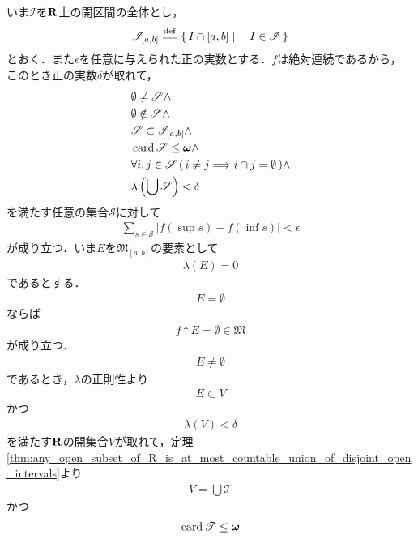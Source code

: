 	\begin{sketch}
		いま$\mathscr{I}$を$\mathbf{R}$上の開区間の全体とし，
		\begin{align}
			\mathscr{I}_{[a,b]} \defeq \Set{I \cap [a,b]}{I \in \mathscr{I}}
		\end{align}
		とおく．また$\epsilon$を任意に与えられた正の実数とする．$f$は絶対連続であるから，
		このとき正の実数$\delta$が取れて，
		\begin{align}
			&\emptyset \neq \mathscr{S} \wedge \\
			&\emptyset \notin \mathscr{S} \wedge \\
			&\mathscr{S} \subset \mathscr{I}_{[a,b]} \wedge \\
			&\operatorname{card} \mathscr{S} \leq {\boldsymbol \omega} \wedge \\
			&\forall i,j \in \mathscr{S}\, (\, i \neq j \Longrightarrow i \cap j = \emptyset\, ) \wedge \\
			&\lambda\left(\bigcup \mathscr{S}\right) < \delta
		\end{align}
		を満たす任意の集合$\mathscr{S}$に対して
		\begin{align}
			\sum_{s \in \mathscr{S}} |f(\sup{}{s}) - f(\inf{}{s})| < \epsilon
		\end{align}
		が成り立つ．いま$E$を$\mathfrak{M}_{[a,b]}$の要素として
		\begin{align}
			\lambda(E) = 0
		\end{align}
		であるとする．
		\begin{align}
			E = \emptyset
		\end{align}
		ならば
		\begin{align}
			f \ast E = \emptyset \in \mathfrak{M}
		\end{align}
		が成り立つ．
		\begin{align}
			E \neq \emptyset
		\end{align}
		であるとき，$\lambda$の正則性より
		\begin{align}
			E \subset V
		\end{align}
		かつ
		\begin{align}
			\lambda(V) < \delta
		\end{align}
		を満たす$\mathbf{R}$の開集合$V$が取れて，定理\ref{thm:any_open_subset_of_R_is_at_most_countable_union_of_disjoint_open_intervals}より
		\begin{align}
			V = \bigcup \mathscr{T}
		\end{align}
		かつ
		\begin{align}
			\operatorname{card} \mathscr{T} \leq {\boldsymbol \omega}
		\end{align}

\end{sketch}
